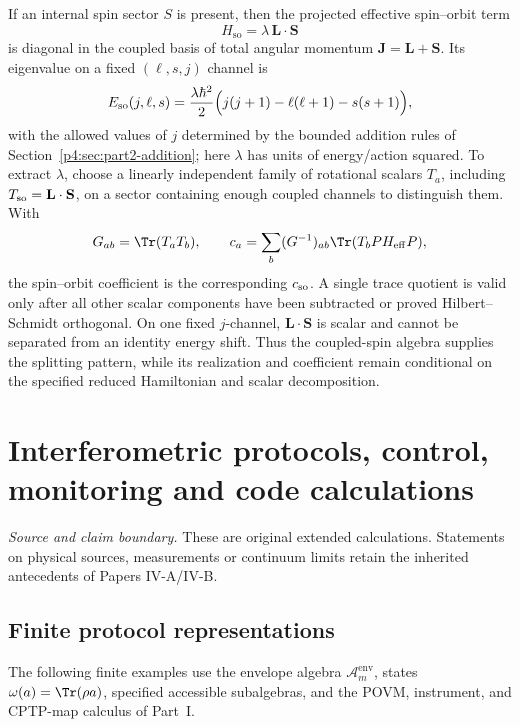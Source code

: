 \documentclass[12pt,a4paper]{article}
\begin{document}
If an internal spin sector $S$ is present, then the projected effective spin--orbit term
\begin{equation}
\label{p4:eq:spin-orbit}
H_{\mathrm{so}}=\lambda\,\mathbf L\cdot\mathbf S
\end{equation}
is diagonal in the coupled basis of total angular momentum $\mathbf J=\mathbf L+\mathbf S$.
Its eigenvalue on a fixed $(\ell,s,j)$ channel is
\begin{equation}
\label{p4:eq:spin-orbit-eigs}
E_{\mathrm{so}}(j,\ell,s)=\frac{\lambda\hbar^2}{2}\Bigl(j(j+1)-\ell(\ell+1)-s(s+1)\Bigr),
\end{equation}
with the allowed values of \(j\) determined by the bounded addition rules of
Section~\ref{p4:sec:part2-addition}; here \(\lambda\) has units of
energy/action squared.  To extract \(\lambda\), choose a linearly independent
family of rotational scalars \(T_a\), including
\(T_{\rm so}=\mathbf L\cdot\mathbf S\), on a sector containing enough coupled
channels to distinguish them.  With
\[
G_{ab}=\Tr(T_aT_b),
\qquad
c_a=\sum_b(G^{-1})_{ab}\Tr(T_bPH_{\rm eff}P),
\]
the spin--orbit coefficient is the corresponding \(c_{\rm so}\).  A single
trace quotient is valid only after all other scalar components have been
subtracted or proved Hilbert--Schmidt orthogonal.  On one fixed \(j\)-channel,
\(\mathbf L\cdot\mathbf S\) is scalar and cannot be separated from an identity
energy shift.  Thus the coupled-spin algebra supplies the splitting pattern,
while its realization and coefficient remain conditional on the specified
reduced Hamiltonian and scalar decomposition.



\section{Interferometric protocols, control, monitoring and code calculations}
\label{p4c:sec:v238-c6}
\noindent\textit{Source and claim boundary.} These are original extended calculations. Statements on physical sources, measurements or continuum limits retain the inherited antecedents of Papers IV-A/IV-B.

\subsection{Finite protocol representations}
\label{p4:sec:part2-protocols}

The following finite examples use the envelope algebra $\mathcal A_m^{\mathrm{env}}$, states $\omega(a)=\Tr(\rho a)$, specified accessible subalgebras, and the POVM, instrument, and CPTP-map calculus of Part~I.
\end{document}
